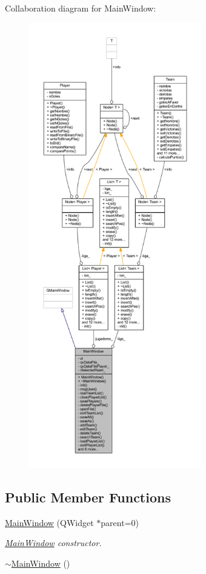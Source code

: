 Collaboration diagram for Main\+Window\+:
\nopagebreak
\begin{figure}[H]
\begin{center}
\leavevmode
\includegraphics[height=550pt]{d0/db8/class_main_window__coll__graph}
\end{center}
\end{figure}
\subsection*{Public Member Functions}
\begin{DoxyCompactItemize}
\item 
\hyperlink{class_main_window_a8b244be8b7b7db1b08de2a2acb9409db}{Main\+Window} (Q\+Widget $\ast$parent=0)
\begin{DoxyCompactList}\small\item\em \hyperlink{class_main_window}{Main\+Window} constructor. \end{DoxyCompactList}\item 
\hyperlink{class_main_window_ae98d00a93bc118200eeef9f9bba1dba7}{$\sim$\+Main\+Window} ()
\end{DoxyCompactItemize}
